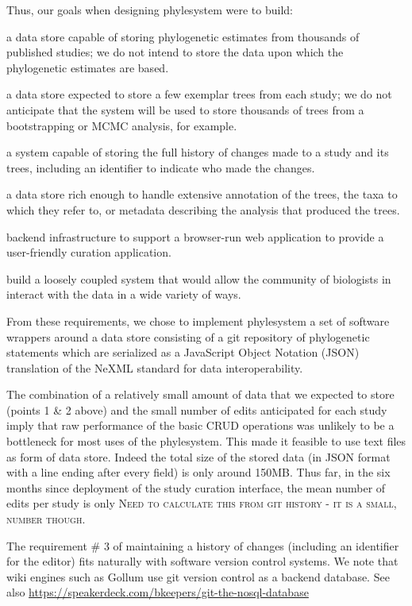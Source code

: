 \documentclass[a4paper,10pt]{article}
\newcommand{\ps}{phylesystem\xspace}
\newcommand{\mthcomment}[1]{{\color{red} \textsc{#1}}\xspace}
\begin{document}
Thus, our goals when designing \ps were to build:
\begin{compactenum}
    \item a data store capable of storing phylogenetic estimates from thousands of published studies; we do not intend to store the data upon which the phylogenetic estimates are based.
    \item a data store expected to store a few exemplar trees from each study; we do not anticipate that the system will be used to store thousands of trees from a bootstrapping or MCMC analysis, for example.
    \item a system capable of storing the full history of changes made to a study and its trees, including an identifier to indicate who made the changes.
    \item a data store rich enough to handle extensive annotation of the trees, the taxa to which they refer to, or metadata describing the analysis that produced the trees.
    \item backend infrastructure to support a browser-run web application to provide a user-friendly curation application.
    \item build a loosely coupled system that would allow the community of biologists in interact with the data in a wide variety of ways.
\end{compactenum}
From these requirements, we chose to implement \ps a set of software wrappers around a data store 
consisting of a git \citep{git} repository of phylogenetic statements which are serialized as a JavaScript Object Notation (JSON) translation
of the NeXML standard for data interoperability\citep{NeXML}.

The combination of a relatively small amount of data that we expected to store (points 1 \& 2 above)
    and the small number of edits anticipated for each study imply that
    raw performance of the basic CRUD operations was unlikely to be a bottleneck for most
    uses of the \ps.
This made it feasible to use text files as form of data store.
Indeed the total size of the stored data (in JSON format with a line ending after 
    every field) is only around 150MB.
    Thus far, in the six months since deployment of the study curation interface, the mean number of edits 
    per study is only \mthcomment{Need to calculate this from git history - it is a small, number though}.

The requirement \# 3 of maintaining a history of changes (including an identifier for the editor) fits
naturally with software version control systems.
We note that wiki engines such as Gollum use git version control as a backend database.
See also \url{https://speakerdeck.com/bkeepers/git-the-nosql-database}
\end{document}
